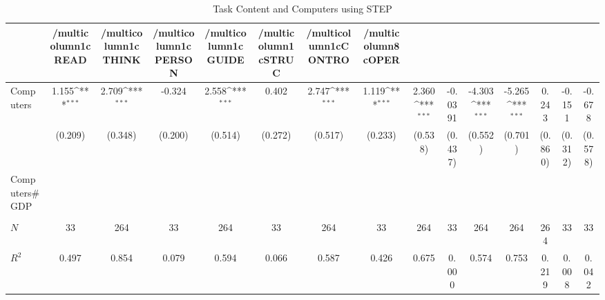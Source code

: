 \begin{table}[htbp]\centering
\def\sym#1{\ifmmode^{#1}\else\(^{#1}\)\fi}
\caption{Task Content and Computers using STEP}
\begin{tabular}{l*{14}{c}}
\hline\hline
            &/multicolumn{1}{c}{READ}&/multicolumn{1}{c}{THINK}&/multicolumn{1}{c}{PERSON}&/multicolumn{1}{c}{GUIDE}&/multicolumn{1}{c}{STRUC}&/multicolumn{1}{c}{CONTRO}&/multicolumn{8}{c}{OPER}                                                                                                                                                       \\
\hline
Computers   &       1.155\sym{***}&       2.709\sym{***}&      -0.324         &       2.558\sym{***}&       0.402         &       2.747\sym{***}&       1.119\sym{***}&       2.360\sym{***}&     -0.0391         &      -4.303\sym{***}&      -5.265\sym{***}&       0.243         &      -0.151         &      -0.678         \\
            &     (0.209)         &     (0.348)         &     (0.200)         &     (0.514)         &     (0.272)         &     (0.517)         &     (0.233)         &     (0.538)         &     (0.437)         &     (0.552)         &     (0.701)         &     (0.860)         &     (0.312)         &     (0.578)         \\
[1em]
Computers#GDP&                     &                     &                     &                     &                     &                     &                     &                     &                     &                     &                     &                     &                     &                     \\
            &                     &                     &                     &                     &                     &                     &                     &                     &                     &                     &                     &                     &                     &                     \\
\hline
\(N\)       &          33         &         264         &          33         &         264         &          33         &         264         &          33         &         264         &          33         &         264         &         264         &         264         &          33         &          33         \\
\(R^{2}\)   &       0.497         &       0.854         &       0.079         &       0.594         &       0.066         &       0.587         &       0.426         &       0.675         &       0.000         &       0.574         &       0.753         &       0.219         &       0.008         &       0.042         \\
\hline\hline
\end{tabular}
\end{table}
